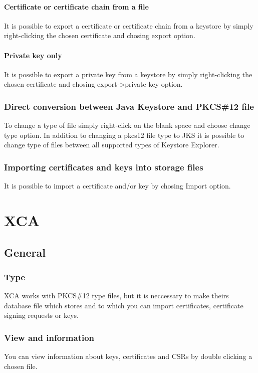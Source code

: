 \documentclass[10pt, a4paper]{report}
\begin{document}
    \subsubsection{Certificate or certificate chain from a file}
It is possible to export a certificate or certificate chain from a keystore by simply right-clicking the chosen certificate and chosing export option.
    \subsubsection{Private key only}
It is possible to export a private key from a keystore by simply right-clicking the chosen certificate and chosing export->private key option.

  \subsection{Direct conversion between Java Keystore and PKCS\#12 file}
To change a type of file simply right-click on the blank space and choose change type option. In addition to changing a pkcs12 file type to JKS it is possible to change type of files between all supported types of Keystore Explorer.
  
  \subsection{Importing certificates and keys into storage files}
It is possible to import a certificate and/or key by chosing Import option.


\chapter{XCA}

\section{General}

  \subsection{Type}
XCA works with PKCS\#12 type files, but it is neccessary to make theirs database file which stores and to which you can import certificates, certificate signing requests or keys.
  \subsection{View and information}
You can view information about keys, certificates and CSRs by double clicking a chosen file.
\end{document}
